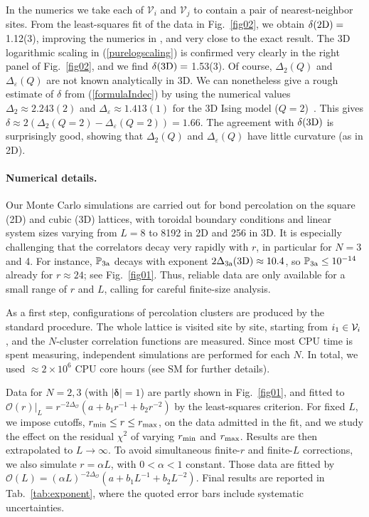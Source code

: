 \documentclass[aps,prl,twocolumn,showpacs,superscriptaddress,groupedaddress]{revtex4}  %
\begin{document}
In the numerics we take each of $ {\mathcal V}_i$ and $ {\mathcal V}_j$ 
to contain a pair of nearest-neighbor sites. 
From the least-squares fit of the data in Fig.~\ref{fig02}, we obtain $\delta(2{\rm D}) = $ 1.12(3), improving the
numerics in \cite{VJS}, and very close to the exact result.
The 3D logarithmic scaling in (\ref{purelogscaling}) is
confirmed very clearly in the right panel of Fig.~\ref{fig02}, and we find $\delta(3{\rm D}) = $ 1.53(3).
Of course, $\Delta_2(Q)$ and $\Delta_{\varepsilon}(Q)$ are not known analytically in 3D.
We can nonetheless give a rough estimate of $\delta$ from (\ref{formulaIndec}) by using the numerical values
$\Delta_2 \approx 2.243(2)$ and $\Delta_\varepsilon \approx 1.413(1)$ for the 3D Ising model ($Q=2$)~\cite{Deng2004,Ferrenberg2018}.
This gives $\delta \approx 2(\Delta_2(Q=2)-\Delta_\varepsilon(Q=2))=1.66$. The agreement
with $\delta(3{\rm D})$
is surprisingly good, showing that $\Delta_2(Q)$ and $\Delta_{\varepsilon}(Q)$ have
little curvature (as in 2D).

\paragraph{Numerical details.}

Our Monte Carlo simulations are carried out for bond percolation on the square (2D) and cubic
(3D) lattices, with toroidal boundary conditions and linear system sizes varying from $L = 8$ to 8192 in 2D and 256 in 3D. 
It is especially challenging that the correlators 
decay very rapidly with $r$, in particular for $N=3$ and 4.
For instance, $\mathbb P_{\rm 3{\rm a}}$ decays with exponent  $2\Delta_{\rm 3{\rm a}}({\rm 3D}) \approx 10.4$, 
so $\mathbb P_{\rm 3{\rm a}} \leq10^{-14}$ already for $ r \approx 24$; see Fig.~\ref{fig01}.
Thus, reliable data are only available for a small range of $r$ and $L$, calling for careful
finite-size analysis.

As a first step, configurations of percolation clusters are produced by the standard procedure.
The whole lattice is visited site by site, starting from $i_1 \in {\cal V}_i$, 
and the $N$-cluster correlation functions are measured. 
Since most CPU time is spent measuring, independent simulations 
are performed for each $N$. In total, we used  $\approx 2 \times 10^6$ CPU core hours (see SM for further details).

Data for $N=2, 3$ (with $|\boldsymbol\delta| = 1$) are partly shown in Fig.~\ref{fig01}, and fitted to
$ \mathcal{O} (r)|_L= r^{-2 \Delta_{\mathcal{O}}} (a+b_1r^{-1} +b_2 r^{-2})$ by the least-squares criterion. 
For fixed $L$, we impose cutoffs, $r_{\rm min} \leq r \leq r_{\rm max}$,
on the data admitted in the fit, and we study the effect on the residual $\chi^2$ 
of varying $r_{\rm min}$ and $r_{\rm max}$. 
Results are then extrapolated to $L \rightarrow \infty$.
To avoid simultaneous finite-$r$ and finite-$L$ corrections,
we also simulate $r = \alpha L$, 
with $ 0 < \alpha < 1$ constant. Those data are fitted by $\mathcal{O} (L)
= (\alpha L)^{-2 \Delta_{\mathcal{O}}} (a+b_1 L ^{-1} +b_2 L^{-2})$.
Final results are reported in Tab.~\ref{tab:exponent}, where the quoted error bars include systematic uncertainties.
\end{document}
